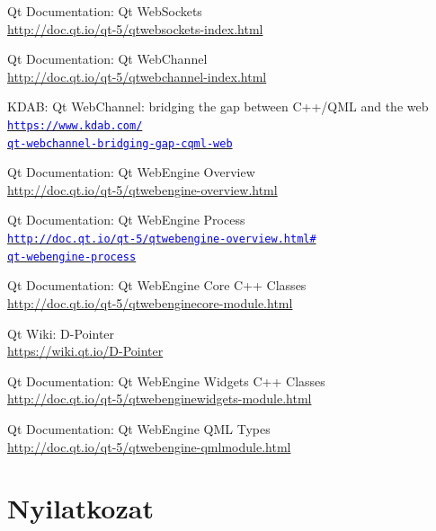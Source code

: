\documentclass[12pt]{report}
\let\orighref\href
\renewcommand{\href}[2]{%
    \orighref{#1}{\textcolor{blue}{\texttt{#2}}}
}
\let\origurl\url
\renewcommand{\url}[1]{%
    \textcolor{blue}{\origurl{#1}}
}
\begin{document}
\begin{thebibliography}{9}
        Qt Documentation: Qt WebSockets \\
        \url{http://doc.qt.io/qt-5/qtwebsockets-index.html}

        Qt Documentation: Qt WebChannel \\
        \url{http://doc.qt.io/qt-5/qtwebchannel-index.html}

        KDAB: Qt WebChannel: bridging the gap between C++/QML and the web \\
        \href{https://www.kdab.com/qt-webchannel-bridging-gap-cqml-web}
        {https://www.kdab.com/\\
        qt-webchannel-bridging-gap-cqml-web}

        Qt Documentation: Qt WebEngine Overview \\
        \url{http://doc.qt.io/qt-5/qtwebengine-overview.html}

        Qt Documentation: Qt WebEngine Process \\
        \href{http://doc.qt.io/qt-5/qtwebengine-overview.html\#qt-webengine-process}
        {http://doc.qt.io/qt-5/qtwebengine-overview.html\#\\
        qt-webengine-process}

        Qt Documentation: Qt WebEngine Core C++ Classes \\
        \url{http://doc.qt.io/qt-5/qtwebenginecore-module.html}

        Qt Wiki: D-Pointer \\
        \url{https://wiki.qt.io/D-Pointer}

        Qt Documentation: Qt WebEngine Widgets C++ Classes \\
        \url{http://doc.qt.io/qt-5/qtwebenginewidgets-module.html}

        Qt Documentation: Qt WebEngine QML Types \\
        \url{http://doc.qt.io/qt-5/qtwebengine-qmlmodule.html}

\end{thebibliography}


\chapter*{Nyilatkozat}
\end{document}

